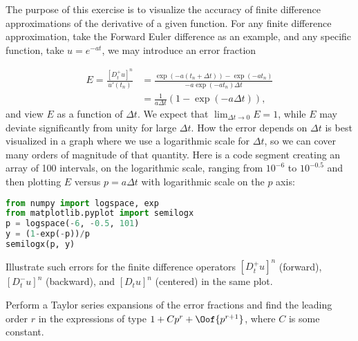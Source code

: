 \documentclass[graybox,sectrefs,envcountresetchap,open=right,final]{svmonodo}
\makeatletter
\newenvironment{doconceexercise}{}{}
\newcounter{doconceexercisecounter}%
\newcommand\listofexercises{
\chapter*{List of Exercises, Problems, and Projects
          \@mkboth{List of Exercises, Problems, and Projects}{List of Exercises, Problems, and Projects}}
\markboth{List of Exercises, Problems, and Projects}{List of Exercises, Problems, and Projects}
\@starttoc{loe}
}
\makeatother
\begin{document}
\begin{doconceexercise}

                
\label{decay:analysis:exer:fd:exp:plot}

The purpose of this exercise is to visualize the accuracy of finite difference
approximations of the derivative of a given function.
For any finite difference approximation, take the Forward Euler difference
as an example, and any specific function, take  $u=e^{-at}$,
we may introduce an error fraction

\begin{align*}
E = \frac{[D_t^+ u]^n}{u'(t_n)} &= \frac{\exp{(-a(t_n+\Delta t))} - \exp{(-at_n)}}{-a\exp{(-at_n)\Delta t}}\\ 
&= \frac{1}{a\Delta t}\left(1 -\exp{(-a\Delta t)}\right),
\end{align*}
and view $E$ as a function of $\Delta t$. We expect that
$\lim_{\Delta t\rightarrow 0}E=1$, while $E$ may deviate significantly from
unity for large $\Delta t$. How the error depends on $\Delta t$ is best
visualized in a graph where we use a logarithmic scale for $\Delta t$,
so we can cover many orders of magnitude of that quantity. Here is
a code segment creating an array of 100 intervals, on the logarithmic
scale, ranging from $10^{-6}$ to $10^{-0.5}$ and then plotting $E$ versus
$p=a\Delta t$ with logarithmic scale on the $p$ axis:







\begin{lstlisting}[language=python,style=blue1_bluegreen]
from numpy import logspace, exp
from matplotlib.pyplot import semilogx
p = logspace(-6, -0.5, 101)
y = (1-exp(-p))/p
semilogx(p, y)

\end{lstlisting}

Illustrate such errors for the finite difference operators $[D_t^+u]^n$
(forward), $[D_t^-u]^n$ (backward), and $[D_t u]^n$ (centered) in
the same plot.

Perform a Taylor series expansions of the error fractions and find
the leading order $r$ in the expressions of type
$1 + Cp^r + \Oof{p^{r+1}}$, where $C$ is some constant.


\end{doconceexercise}
\end{document}
